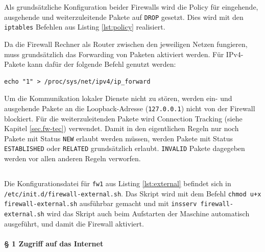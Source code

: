 \noindent Als grundsätzliche Konfiguration beider Firewalls wird die Policy für
eingehende, ausgehende und weiterzuleitende Pakete auf {\tt DROP} gesetzt.
Dies wird mit den {\tt iptables} Befehlen aus Listing \ref{lst:policy}
realisiert.



\noindent Da die Firewall Rechner als Router zwischen den jeweiligen Netzen
fungieren, muss grundsätzlich das Forwarding von Paketen aktiviert werden.
Für IPv4-Pakete kann dafür der folgende Befehl genutzt werden:

\begin{verbatim}
echo "1" > /proc/sys/net/ipv4/ip_forward
\end{verbatim}

\noindent Um die Kommunikation lokaler Dienste nicht zu stören, werden ein-
und ausgehende Pakete an die Loopback-Adresse ({\tt 127.0.0.1}) nicht von der
Firewall blockiert.
Für die weiterzuleitenden Pakete wird Connection Tracking
(siehe Kapitel \ref{sec.fw-tec}) verwendet.
Damit in den eigentlichen Regeln nur noch Pakete mit Status {\tt NEW} erlaubt
werden müssen, werden Pakete mit Status {\tt ESTABLISHED} oder {\tt RELATED}
grundsätzlich erlaubt.
{\tt INVALID} Pakete dagegeben werden vor allen anderen Regeln verworfen.




\subsection{\fwa}\label{sec.konfig.fwa}

Die Konfigurationsdatei für {\tt fw1} aus Listing \ref{lst:external}
befindet sich in\\
{\tt /etc/init.d/firewall-external.sh}.
Das Skript wird mit dem Befehl {\tt chmod u+x firewall-external.sh}
ausführbar gemacht und mit {\tt insserv firewall-external.sh}
wird das Skript auch beim Aufstarten der Maschine automatisch ausgeführt,
und damit die Firewall aktiviert.

\paragraph{§ 1 Zugriff auf das Internet}

